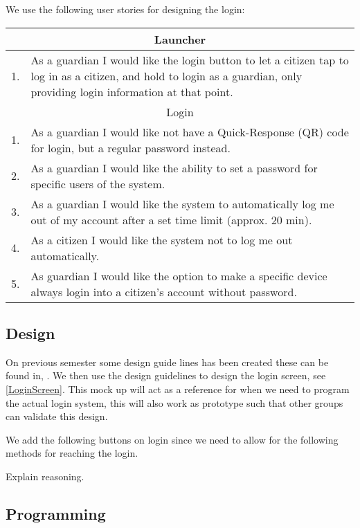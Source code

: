 We use the following user stories for designing the login:
\begin{table}[H]
\begin{tabular}{|c|p{12.5cm}|}
\hline 
\multicolumn{2}{|c|}{Launcher}\\
\hline
1. & As a guardian I would like the login button to let a citizen tap to log in
as a citizen, and hold to login as a guardian, only providing login information
at that point. \\ \hline
\multicolumn{2}{|c|}{Login}\\ \hline
1. & As a guardian I would like not have a Quick-Response (QR) code for login,
but a regular password instead.\\ \hline
2. & As a guardian I would like the ability to set a password for specific users
of the system.\\ \hline
3. & As a guardian I would like the system to automatically log me out of my
account after a set time limit (approx. 20 min).\\ \hline
4. & As a citizen I would like the system not to log me out automatically.\\ \hline
5. & As guardian I would like the option to make a specific device always login
into a citizen's account without password.\\ \hline
\end{tabular}
\end{table}

\subsection{Design}

On previous semester some design guide lines has been created these can be
found in, . We then use the design
guidelines to design the login screen, see \autoref{LoginScreen}. This mock up
will act as a reference for when we need to program the actual login system,
this will also work as prototype such that other groups can validate this
design. 

We add the following buttons on login since we need to allow for the
following methods for reaching the login.


Explain reasoning.

\subsection{Programming}




